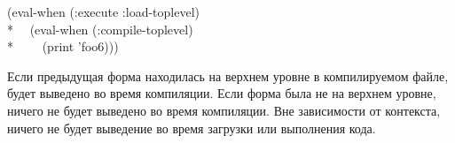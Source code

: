 \begin{defspec}
\begin{lisp}
  (eval-when (:execute :load-toplevel) \\*
  ~~(eval-when (:compile-toplevel) \\*
  ~~~~(print 'foo6)))
\end{lisp}
Если предыдущая форма находилась на верхнем уровне в компилируемом файле,
 будет выведено во время компиляции. Если форма была не на верхнем
уровне, ничего не будет выведено во время компиляции. Вне зависимости от
контекста, ничего не будет выведение во время загрузки или выполнения кода.
\end{defspec}

\fi